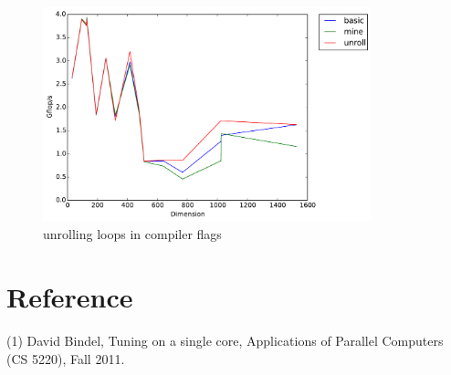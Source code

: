 \documentclass[12pt]{article}
\numberwithin{equation}{section}
\begin{document}
\begin{figure}[!ht]
\begin{center}
\includegraphics[width=0.85\textwidth] {timing_unroll}
\caption{unrolling loops in compiler flags}
\end{center}
\end{figure}





\section*{Reference}

(1) David Bindel, Tuning on a single core, Applications of Parallel Computers (CS 5220), Fall 2011.
\end{document}
